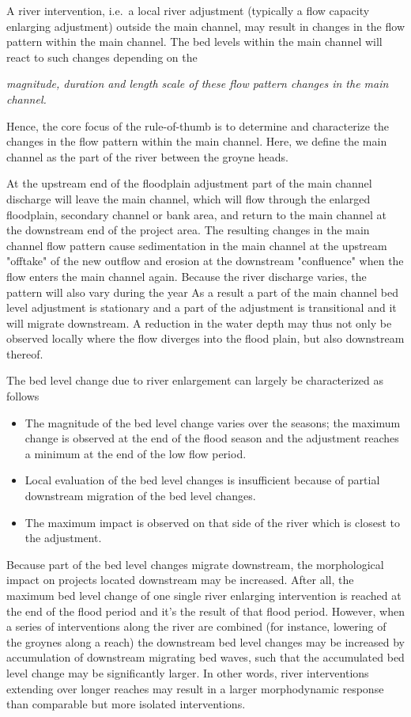 A river intervention, i.e.~a local river adjustment (typically a flow capacity enlarging adjustment) outside the main channel, may result in changes in the flow pattern within the main channel.
The bed levels within the main channel will react to such changes depending on the

\hspace{1cm}\emph{magnitude, duration and length scale of these flow pattern changes in the main channel.}

Hence, the core focus of the rule-of-thumb is to determine and characterize the changes in the flow pattern within the main channel.
Here, we define the main channel as the part of the river between the groyne heads.

At the upstream end of the floodplain adjustment part of the main channel discharge will leave the main channel, which will flow through the enlarged floodplain, secondary channel or bank area, and return to the main channel at the downstream end of the project area.
The resulting changes in the main channel flow pattern cause sedimentation in the main channel at the upstream "offtake" of the new outflow and erosion at the downstream "confluence" when the flow enters the main channel again.
Because the river discharge varies, the pattern will also vary during the year
As a result a part of the main channel bed level adjustment is stationary and a part of the adjustment is transitional and it will migrate downstream.
A reduction in the water depth may thus not only be observed locally where the flow diverges into the flood plain, but also downstream thereof.

The bed level change due to river enlargement can largely be characterized as follows

\begin{itemize}
\item The magnitude of the bed level change varies over the seasons; the maximum change is observed at the end of the flood season and the adjustment reaches a minimum at the end of the low flow period.

\item Local evaluation of the bed level changes is insufficient because of partial downstream migration of the bed level changes.

\item The maximum impact is observed on that side of the river which is closest to the adjustment.
\end{itemize}

Because part of the bed level changes migrate downstream, the morphological impact on projects located downstream may be increased.
After all, the maximum bed level change of one single river enlarging intervention is reached at the end of the flood period and it's the result of that flood period.
However, when a series of interventions along the river are combined (for instance, lowering of the groynes along a reach) the downstream bed level changes may be increased by accumulation of downstream migrating bed waves, such that the accumulated bed level change may be significantly larger.
In other words, river interventions extending over longer reaches may result in a larger morphodynamic response than comparable but more isolated interventions.

